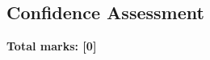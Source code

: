 \documentclass[../s1]{subfiles}
\begin{document}
\subsection*{Confidence Assessment}
\thispagestyle{fancy}



\begin{flushright}
\textbf{Total marks: [0]}
\end{flushright}
\end{document}
